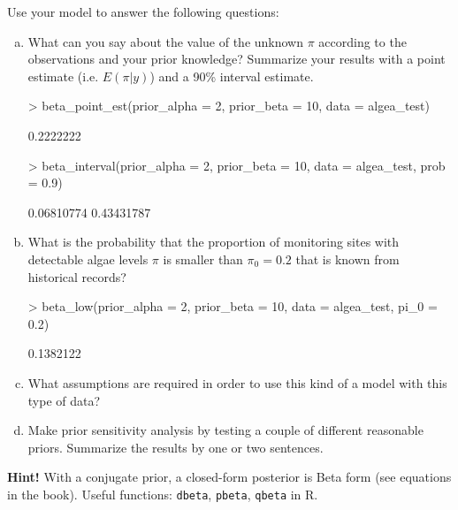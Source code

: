 \documentclass[a4paper,11pt]{article}
\begin{document}
Use your model to answer the following questions:
\begin{enumerate}[a)]
\item What can you say about the value of the unknown $\pi$ according
  to the observations and your prior knowledge? Summarize your results
  with a point estimate (i.e. $E(\pi|y)$) and a 90\% interval estimate.
\begin{Schunk}
\begin{Sinput}
> beta_point_est(prior_alpha = 2, prior_beta = 10, data = algea_test)
\end{Sinput}
\begin{Soutput}
[1] 0.2222222
\end{Soutput}
\begin{Sinput}
> beta_interval(prior_alpha = 2, prior_beta = 10, data = algea_test, prob = 0.9)
\end{Sinput}
\begin{Soutput}
[1] 0.06810774 0.43431787
\end{Soutput}
\end{Schunk}
\item What is the probability that the proportion of monitoring sites with detectable algae levels $\pi$ is smaller than $\pi_0=0.2$ that is known from historical records?
\begin{Schunk}
\begin{Sinput}
> beta_low(prior_alpha = 2, prior_beta = 10, data = algea_test, pi_0 = 0.2)
\end{Sinput}
\begin{Soutput}
[1] 0.1382122
\end{Soutput}
\end{Schunk}
\item What assumptions are required in order to use this kind of a
  model with this type of data?
\item Make prior sensitivity analysis by testing a couple of different reasonable priors. Summarize the results by one or two sentences.
\end{enumerate}
\textbf{Hint!} With a conjugate prior, a closed-form posterior is Beta form (see
equations in the book). Useful functions: {\tt dbeta}, {\tt pbeta}, {\tt qbeta} in R.
\end{document}
